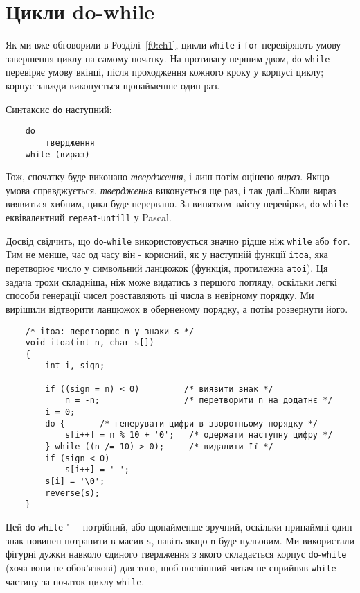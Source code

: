 \documentclass[a4paper,12pt]{book}
\begin{document}
\section{Цикли do-while}

\label{f0:ch3.6}
  Як ми вже обговорили в Розділі~\ref{f0:ch1}, цикли \texttt{while} і \texttt{for}
  перевіряють умову завершення циклу на самому початку. На противагу першим двом,
  \texttt{do}-\texttt{while} перевіряє умову вкінці, після проходження кожного кроку у
  корпусі циклу; корпус завжди виконується щонайменше один раз.

  Синтаксис
  \texttt{do} наступний:
  \begin{verbatim}
    do
        твердження
    while (вираз)
  \end{verbatim}

  Тож, спочатку буде виконано \textit{твердження}, і лиш потім оцінено \textit{вираз}. Якщо
  умова справджується, \textit{твердження} виконується ще раз, і так далі\ldots Коли вираз
  виявиться хибним, цикл буде перервано. За винятком змісту перевірки,
  \texttt{do}-\texttt{while} еквівалентний \texttt{repeat}-\texttt{untill} у Pascal.

  Досвід свідчить, що \texttt{do}-\texttt{while} використовується значно рідше ніж
  \texttt{while} або \texttt{for}. Тим не менше, час од часу він - корисний, як у
  наступній функції \texttt{itoa}, яка перетворює число у символьний ланцюжок (функція,
  протилежна \texttt{atoi}). Ця задача трохи складніша, ніж може видатись з першого
  погляду, оскільки легкі способи генерації чисел розставляють ці числа в невірному
  порядку. Ми вирішили відтворити ланцюжок в оберненому порядку, а потім розвернути його.
  \begin{verbatim}
    /* itoa: перетворює n у знаки s */
    void itoa(int n, char s[])
    {
        int i, sign;

        if ((sign = n) < 0)         /* виявити знак */
            n = -n;                 /* перетворити n на додатнє */
        i = 0;
        do {       /* генерувати цифри в зворотньому порядку */
            s[i++] = n % 10 + '0';   /* одержати наступну цифру */
        } while ((n /= 10) > 0);     /* видалити її */
        if (sign < 0)
            s[i++] = '-';
        s[i] = '\0';
        reverse(s);
    }
  \end{verbatim}

  Цей
  \texttt{do}-\texttt{while} "--- потрібний, або щонайменше зручний, оскільки принаймні
  один знак повинен потрапити в масив \texttt{s}, навіть якщо \texttt{n} буде нульовим. Ми
  використали фігурні дужки навколо єдиного твердження з якого складається корпус
  \texttt{do}-\texttt{while} (хоча вони не обов'язкові) для того, щоб поспішний читач не
  сприйняв \texttt{while}-частину за початок циклу \texttt{while}.
\end{document}
